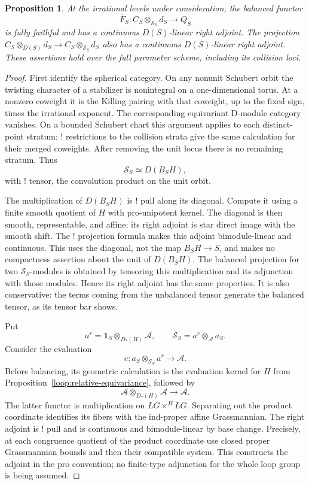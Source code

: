 \documentclass[11pt]{article}
\numberwithin{equation}{section}
\newtheorem{proposition}[theorem]{Proposition}
\theoremstyle{definition}
\theoremstyle{remark}
\begin{document}
\begin{proposition}\label{loop:pairing-adjoints}
At the irrational levels under consideration, the balanced functor
\[
               \overline F_S:
               C_S\otimes_{\mathcal S_S}d_S\longrightarrow Q_S
\]
is fully faithful and has a continuous $D(S)$-linear right adjoint.
The projection
$C_S\otimes_{D(S)}d_S\to C_S\otimes_{\mathcal S_S}d_S$
also has a continuous $D(S)$-linear right adjoint.
These assertions hold over the full parameter scheme, including
its collision loci.
\end{proposition}

\begin{proof}
First identify the spherical category.  On any nonunit Schubert
orbit the twisting character of a stabilizer is nonintegral on
a one-dimensional torus.  At a nonzero coweight it is the
Killing pairing with that coweight, up to the fixed sign, times
the irrational exponent.  The corresponding equivariant
D-module category vanishes.  On a bounded Schubert chart this
argument applies to each distinct-point stratum; ! restrictions
to the collision strata give the same calculation for their
merged coweights.  After removing the unit locus there is no
remaining stratum.  Thus
\[
                         \mathcal S_S\simeq D(B_SH),
\]
with ! tensor, the convolution product on the unit orbit.

The multiplication of $D(B_SH)$ is ! pull along its diagonal.
Compute it using a finite smooth quotient of $H$ with
pro-unipotent kernel.  The diagonal is then smooth,
representable, and affine; its right adjoint is star direct
image with the smooth shift.  The ! projection formula makes
this adjoint bimodule-linear and continuous.  This uses the diagonal,
not the map $B_SH\to S$, and makes no compactness assertion about
the unit of $D(B_SH)$.  The balanced
projection for two $\mathcal S_S$-modules is obtained by
tensoring this multiplication and its adjunction with those
modules.  Hence its right adjoint has the same properties.
It is also conservative: the terms coming from the unbalanced
tensor generate the balanced tensor, as its tensor bar shows.

Put
\[
        a^r=\mathbf1_S\otimes_{D_*(H)}\mathcal A,
        \qquad
        \mathcal S_S=a^r\otimes_{\mathcal A}a_S.
\]
Consider the evaluation
\[
             e:a_S\otimes_{\mathcal S_S}a^r\longrightarrow\mathcal A.
\]
Before balancing, its geometric calculation is the evaluation
kernel for $H$ from Proposition~\ref{loop:relative-equivariance},
followed by
\[
             \mathcal A\otimes_{D_*(H)}\mathcal A
                            \longrightarrow\mathcal A.
\]
The latter functor is multiplication on $LG\times^H LG$.
Separating out the product coordinate identifies its fibers
with the ind-proper affine Grassmannian.  The right adjoint is
! pull and is continuous and bimodule-linear by base change.
Precisely, at each congruence quotient of the product coordinate
use closed proper Grassmannian bounds and then their compatible
system.  This constructs the adjoint in the pro convention;
no finite-type adjunction for the whole loop group is being
assumed.


\end{proof}
\end{document}
